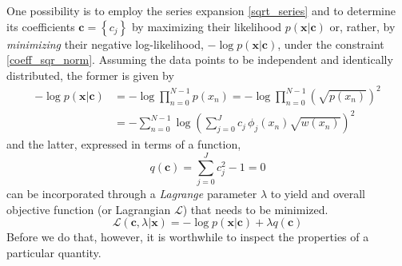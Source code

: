 \documentclass[]{report}
\begin{document}
	One possibility is to employ the series expansion \ref{sqrt_series} and to determine its coefficients $\mathbf{c}=\left\{c_j\right\}$ by maximizing their likelihood $p(\mathbf{x}\vert\mathbf{c})$ or, rather, by \emph{minimizing} their negative log-likelihood, $-\log p(\mathbf{x}\vert\mathbf{c})$, under the constraint \ref{coeff_sqr_norm}. Assuming the data points to be independent and identically distributed, the former is given by
	\begin{align}\label{log_likelihood}
		-\log p(\mathbf{x}\vert\mathbf{c}) & = -\log\prod_{n=0}^{N-1}p(x_n) = -\log\prod_{n=0}^{N-1}\left(\sqrt{p(x_n)}\right)^2 \nonumber \\
		& = -\sum_{n=0}^{N-1}\log\left(\sum_{j=0}^{J}c_j\,\phi_j(x_n)\sqrt{w(x_n)}\right)^2
	\end{align}
	and the latter, expressed in terms of a function,
	\begin{equation}\label{constraint}
		q(\mathbf{c}) = \sum_{j=0}^{J}c_j^2 - 1 = 0
	\end{equation}
	can be incorporated through a \emph{Lagrange} parameter $\lambda$ to yield and overall objective function (or Lagrangian $\mathcal{L}$) that needs to be minimized.
	\begin{equation}\label{lagrangian}
		\mathcal{L}(\mathbf{c},\lambda\vert\mathbf{x}) = -\log p(\mathbf{x}\vert\mathbf{c}) + \lambda q(\mathbf{c})
	\end{equation}
	Before we do that, however, it is worthwhile to inspect the properties of a particular quantity.
	
\end{document}
